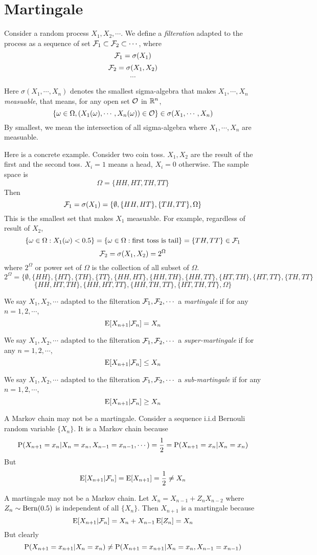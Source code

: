 \section{Martingale}
Consider a random process $X_1, X_2, \cdots$. We define a \textit{filteration} adapted to the process as a sequence of set $\Fc_1\subset \Fc_2 \subset \cdots$, where
$$\Fc_1 = \sigma(X_1)$$
$$\Fc_2 = \sigma(X_1, X_2)$$
$$\cdots$$

Here $\sigma(X_1,\cdots, X_n)$ denotes the smallest sigma-algebra that makes $X_1,\cdots, X_n$ \textit{measuable}, that means, for any open set $\Oc$ in $\Real^n$,
$$\left\{\omega\in \Omega, (X_1(\omega), \cdots, X_n(\omega))\in  \Oc \right\} \in \sigma(X_1,\cdots, X_n)$$
By smallest, we mean the intersection of all sigma-algebra where $X_1,\cdots,X_n$ are measuable.

Here is a concrete example. Consider two coin toss. $X_1, X_2$ are the result of the first and the second toss. $X_i = 1$ means a head, $X_i=0$ otherwise. The sample space is
$$\Omega = \{HH, HT,TH,TT\}$$
Then 
$$\Fc_1 = \sigma(X_1) =\{\emptyset, \{HH, HT\}, \{TH, TT\}, \Omega \}$$
This is the smallest set that makes $X_1$ measuable. For example, regardless of result of $X_2$, 
$$\{\omega\in \Omega: X_1(\omega)<0.5\} = \{\omega\in \Omega: \textrm{first toss is tail}\} = \{TH,TT \} \in \Fc_1$$
$$\Fc_2 = \sigma(X_1, X_2)=2^\Omega$$
where $2^\Omega$ or power set of $\Omega$ is the collection of all subset of $\Omega$.
$$2^\Omega =\{\emptyset, \{HH\},\{HT\},\{TH\},\{TT\},\{HH,HT\}, \{HH,TH\},\{HH,TT\},\{HT,TH\},\{HT,TT\},\{TH,TT\}$$
$$\{HH,HT,TH\},\{HH,HT,TT\},\{HH,TH,TT\},\{HT,TH,TT\}, \Omega \}$$

We say $X_1, X_2, \cdots$ adapted to the filteration $\Fc_1,\Fc_2,\cdots$ a \textit{martingale} if for any $n=1,2,\cdots$,
$$\E[X_{n+1}|\Fc_{n}] = X_n$$ 

We say $X_1, X_2, \cdots$ adapted to the filteration $\Fc_1,\Fc_2,\cdots$ a \textit{super-martingale} if for any $n=1,2,\cdots$,
$$\E[X_{n+1}|\Fc_{n}] \leq X_n$$ 

We say $X_1, X_2, \cdots$ adapted to the filteration $\Fc_1,\Fc_2,\cdots$ a \textit{sub-martingale} if for any $n=1,2,\cdots$,
$$\E[X_{n+1}|\Fc_{n}] \geq X_n$$ 

\begin{remark}
	A Markov chain may not be a martingale. Consider a sequence i.i.d Bernouli random variable $\{X_n\}$. It is a Markov chain because
	 $$\P(X_{n+1}=x_{n}|X_n=x_n,X_{n-1}= x_{n-1}, \cdots) = \frac{1}{2} = \P(X_{n+1}=x_{n}|X_n=x_n)$$
	But
	$$\E[X_{n+1}|\Fc_n] = \E[X_{n+1}]=\frac{1}{2}\neq X_n$$
	
	A martingale may not be a Markov chain. Let $X_n= X_{n-1}+Z_nX_{n-2}$ where $Z_n\sim \Bern(0.5)$ is independent of all $\{X_n\}$. Then $X_{n+1}$ is a martingale because
	$$\E[X_{n+1}|\Fc_n] = X_n+X_{n-1}\E[Z_n]= X_n$$
	But clearly
	$$\P(X_{n+1}=x_{n+1}|X_n=x_n) \neq \P(X_{n+1}=x_{n+1}|X_n=x_n,X_{n-1}=x_{n-1})$$
\end{remark}


